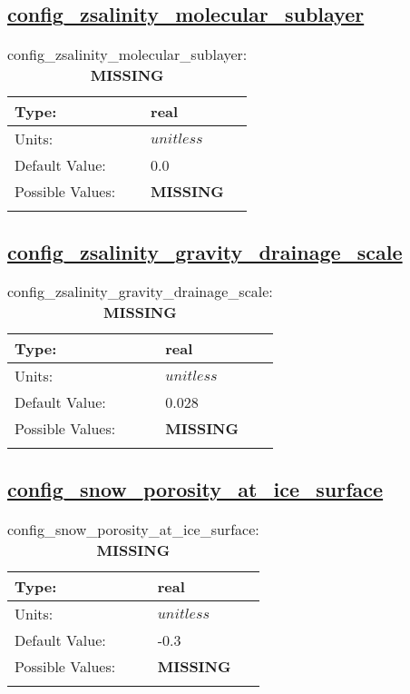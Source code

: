 \subsection[config\_zsalinity\_molecular\_sublayer]{\hyperref[sec:nm_tab_biogeochemistry]{config\_zsalinity\_molecular\_sublayer}}
\label{subsec:nm_sec_config_zsalinity_molecular_sublayer}
\begin{center}
\begin{longtable}{| p{2.0in} || p{4.0in} |}
    \hline
    Type: & real \\
    \hline
    Units: & $unitless$ \\
    \hline
    Default Value: & 0.0 \\
    \hline
    Possible Values: & {\bf \color{red} MISSING} \\
    \hline
    \caption{config\_zsalinity\_molecular\_sublayer: {\bf \color{red} MISSING}}
\end{longtable}
\end{center}
\subsection[config\_zsalinity\_gravity\_drainage\_scale]{\hyperref[sec:nm_tab_biogeochemistry]{config\_zsalinity\_gravity\_drainage\_scale}}
\label{subsec:nm_sec_config_zsalinity_gravity_drainage_scale}
\begin{center}
\begin{longtable}{| p{2.0in} || p{4.0in} |}
    \hline
    Type: & real \\
    \hline
    Units: & $unitless$ \\
    \hline
    Default Value: & 0.028 \\
    \hline
    Possible Values: & {\bf \color{red} MISSING} \\
    \hline
    \caption{config\_zsalinity\_gravity\_drainage\_scale: {\bf \color{red} MISSING}}
\end{longtable}
\end{center}
\subsection[config\_snow\_porosity\_at\_ice\_surface]{\hyperref[sec:nm_tab_biogeochemistry]{config\_snow\_porosity\_at\_ice\_surface}}
\label{subsec:nm_sec_config_snow_porosity_at_ice_surface}
\begin{center}
\begin{longtable}{| p{2.0in} || p{4.0in} |}
    \hline
    Type: & real \\
    \hline
    Units: & $unitless$ \\
    \hline
    Default Value: & -0.3 \\
    \hline
    Possible Values: & {\bf \color{red} MISSING} \\
    \hline
    \caption{config\_snow\_porosity\_at\_ice\_surface: {\bf \color{red} MISSING}}
\end{longtable}
\end{center}
